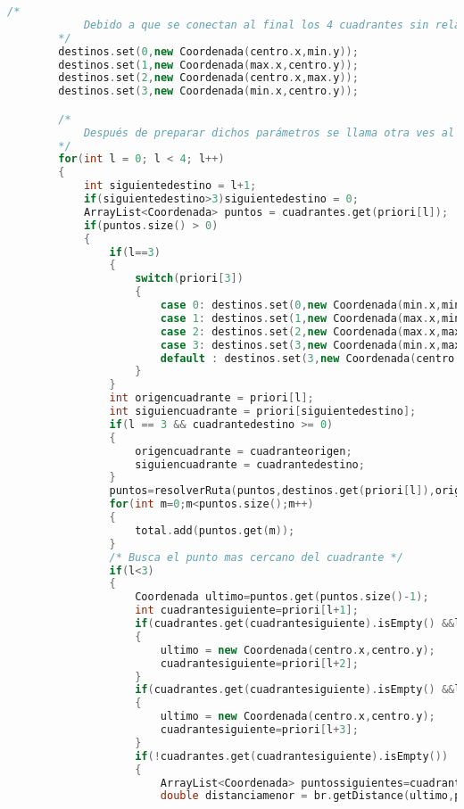 \begin{lstlisting}[language=C++, caption=Algoritmo Base del Método de Cuadrantes, label=lst:codigo11,escapechar=|]
        /* 
            Debido a que se conectan al final los 4 cuadrantes sin relacionarse y el primer punto es el origen se crea unos puntos intermedios para verificar la cercanía que hay en el eje X o Y dependiendo de la cuadrante, el mas cercano se convierte en el primer punto 
        */           
		destinos.set(0,new Coordenada(centro.x,min.y));
		destinos.set(1,new Coordenada(max.x,centro.y));
		destinos.set(2,new Coordenada(centro.x,max.y));       
		destinos.set(3,new Coordenada(min.x,centro.y));    

        /* 
            Después de preparar dichos parámetros se llama otra ves al método resolverruta en cada cuadrante, el resultado se añadirá a la lista total, cabe decir que este cambio de métodos de resolverRuta y resolverCuadrante se pueden llegar a repetir hasta el infinito, hasta que satisfaga el limite 
        */             
		for(int l = 0; l < 4; l++)
		{
			int siguientedestino = l+1;
			if(siguientedestino>3)siguientedestino = 0;
			ArrayList<Coordenada> puntos = cuadrantes.get(priori[l]);
			if(puntos.size() > 0)
			{
				if(l==3)
				{
					switch(priori[3])
					{
						case 0: destinos.set(0,new Coordenada(min.x,min.y));
						case 1: destinos.set(1,new Coordenada(max.x,min.y));
						case 2: destinos.set(2,new Coordenada(max.x,max.y));                               
						case 3: destinos.set(3,new Coordenada(min.x,max.y));
						default : destinos.set(3,new Coordenada(centro.x,centro.y)); 
					}                    
				}
				int origencuadrante = priori[l];
				int siguiencuadrante = priori[siguientedestino];
				if(l == 3 && cuadrantedestino >= 0) 
				{
					origencuadrante = cuadranteorigen;
					siguiencuadrante = cuadrantedestino;
				}
				puntos=resolverRuta(puntos,destinos.get(priori[l]),origencuadrante,siguiencuadrante);
				for(int m=0;m<puntos.size();m++)
				{
					total.add(puntos.get(m));
				}   
				/* Busca el punto mas cercano del cuadrante */
				if(l<3)
				{
					Coordenada ultimo=puntos.get(puntos.size()-1);
					int cuadrantesiguiente=priori[l+1];
					if(cuadrantes.get(cuadrantesiguiente).isEmpty() &&l<2)
					{
						ultimo = new Coordenada(centro.x,centro.y);
						cuadrantesiguiente=priori[l+2];  
					}                     
					if(cuadrantes.get(cuadrantesiguiente).isEmpty() &&l<1)
					{
						ultimo = new Coordenada(centro.x,centro.y);
						cuadrantesiguiente=priori[l+3]; 
					}
					if(!cuadrantes.get(cuadrantesiguiente).isEmpty())
					{
						ArrayList<Coordenada> puntossiguientes=cuadrantes.get(cuadrantesiguiente); 
						double distanciamenor = br.getDistance(ultimo,puntossiguientes.get(0));

\end{lstlisting}
